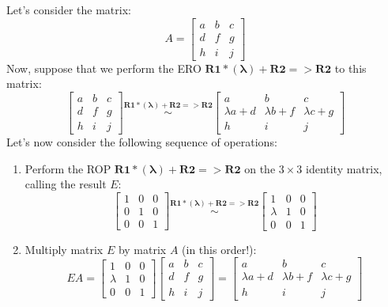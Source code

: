 \documentclass[12pt]{article}
\begin{document}
Let's consider the matrix:
\[
A=\begin{bmatrix}a&b&c\\d&f&g\\h&i&j\end{bmatrix}
\]
Now, suppose that we perform the ERO $\mathbf{R1*(\lambda)+R2=>R2}$ to this matrix:
\begin{equation}
\label{matrixA-rop}
\begin{bmatrix}a&b&c\\d&f&g\\h&i&j\end{bmatrix}
\stackrel{\mathbf{R1*(\lambda)+R2=>R2}}{\sim}
\begin{bmatrix}a&b&c\\\lambda a+d&\lambda b+f&\lambda c+g\\h&i&j\end{bmatrix}
\end{equation}
Let's now consider the following sequence of operations:
\begin{enumerate}
\item Perform the ROP $\mathbf{R1*(\lambda)+R2=>R2}$ on the $3\times3$ identity matrix, calling the result $E$:
\[
\begin{bmatrix}1&0&0\\0&1&0\\0&0&1\end{bmatrix}
\stackrel{\mathbf{R1*(\lambda)+R2=>R2}}{\sim}
\begin{bmatrix}1&0&0\\\lambda&1&0\\0&0&1\end{bmatrix}
\]
\item Multiply matrix $E$ by matrix $A$ (in this order!):
\begin{equation}
\label{matrixA-mult}
EA=\begin{bmatrix}1&0&0\\\lambda&1&0\\0&0&1\end{bmatrix}
\begin{bmatrix}a&b&c\\d&f&g\\h&i&j\end{bmatrix}=
\begin{bmatrix}a&b&c\\\lambda a+d&\lambda b+f&\lambda c+g\\h&i&j\end{bmatrix}
\end{equation}
\end{enumerate}
\end{document}
